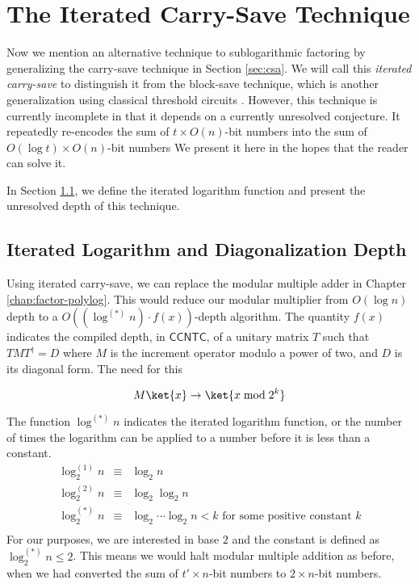 \section{The Iterated Carry-Save Technique}
\label{sec:blocksave}

Now we mention an alternative technique to sublogarithmic
factoring by generalizing
the carry-save technique in Section \ref{sec:csa}. We will call this
\emph{iterated carry-save} to distinguish it from the block-save
technique, which is another generalization using classical threshold
circuits \cite{Siu1993}. However, this technique is currently incomplete
in that it depends on a currently unresolved conjecture. It repeatedly
re-encodes the sum of $t\times O(n)$-bit numbers into the
sum of $O(\log t) \times O(n)$-bit numbers We present it
here in the hopes that the reader can solve it.

In Section \ref{subsec:fsl-itlog}, we define the iterated logarithm
function and present the unresolved depth of this technique.

\subsection{Iterated Logarithm and Diagonalization Depth}
\label{subsec:fsl-itlog}

Using iterated carry-save, we can replace the modular multiple adder in
Chapter \ref{chap:factor-polylog}. This
would reduce our modular multiplier from $O(\log n)$ depth to 
a $O((\log^{(*)}n)\cdot f(x))$-depth algorithm. The quantity $f(x)$ indicates
the compiled depth, in $\textsf{CCNTC}$, of a unitary matrix $T$ such that $TMT^{\dag} = D$
where $M$ is the increment operator modulo a power of two, and $D$ is its diagonal form.
The need for this 

\begin{equation}
M\ket{x} \rightarrow \ket{x \bmod 2^k}
\end{equation}

The function $\log^{(*)}n$ indicates
the iterated logarithm function, or the number of times the
logarithm can be applied to a number before it is less than a
constant.
\begin{eqnarray}
\log^{(1)}_2 n & \equiv & \log_2 n \\
\log^{(2)}_2 n & \equiv & \log_2\log_2 n \\
\log^{(*)}_2 n & \equiv & \log_2 \cdots \log_2 n < k \text{ for some positive constant } k\\
\end{eqnarray}
For our purposes, we are interested in base $2$ and
the constant is defined as $\log^{(*)}_2 n \le 2$. This
means we would halt modular multiple addition as before, when we
had converted the sum of $t'\times n$-bit numbers to $2 \times n$-bit numbers.

